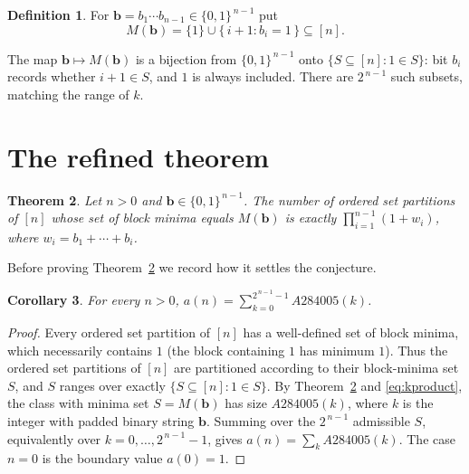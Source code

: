 \documentclass[11pt]{article}
\newtheorem{theorem}{Theorem}[section]
\newtheorem{corollary}[theorem]{Corollary}
\theoremstyle{definition}
\newtheorem{definition}[theorem]{Definition}
\theoremstyle{remark}
\newcommand{\bit}{\mathbf{b}}
\begin{document}
\begin{definition}\label{def:M}
For $\bit=b_1\cdots b_{n-1}\in\{0,1\}^{\,n-1}$ put
\[
  M(\bit)=\{1\}\cup\{\,i+1 : b_i=1\,\}\subseteq[n].
\]
\end{definition}

The map $\bit\mapsto M(\bit)$ is a bijection from $\{0,1\}^{\,n-1}$ onto
$\{S\subseteq[n] : 1\in S\}$: bit $b_i$ records whether $i+1\in S$, and $1$ is
always included. There are $2^{\,n-1}$ such subsets, matching the range of $k$.

\section{The refined theorem}\label{sec:proof}

\begin{theorem}\label{thm:refined}
Let $n>0$ and $\bit\in\{0,1\}^{\,n-1}$. The number of ordered set partitions of
$[n]$ whose set of block minima equals $M(\bit)$ is exactly
$\prod_{i=1}^{n-1}(1+w_i)$, where $w_i=b_1+\cdots+b_i$.
\end{theorem}

Before proving Theorem~\ref{thm:refined} we record how it settles the
conjecture.

\begin{corollary}
For every $n>0$, $a(n)=\sum_{k=0}^{2^{\,n-1}-1}A284005(k)$.
\end{corollary}

\begin{proof}
Every ordered set partition of $[n]$ has a well-defined set of block minima,
which necessarily contains $1$ (the block containing $1$ has minimum $1$). Thus
the ordered set partitions of $[n]$ are partitioned according to their
block-minima set $S$, and $S$ ranges over exactly $\{S\subseteq[n]:1\in S\}$.
By Theorem~\ref{thm:refined} and \eqref{eq:kproduct}, the class with minima set
$S=M(\bit)$ has size $A284005(k)$, where $k$ is the integer with padded binary
string $\bit$. Summing over the $2^{\,n-1}$ admissible $S$, equivalently over
$k=0,\dots,2^{\,n-1}-1$, gives $a(n)=\sum_k A284005(k)$. The case $n=0$ is the
boundary value $a(0)=1$.
\end{proof}
\end{document}
